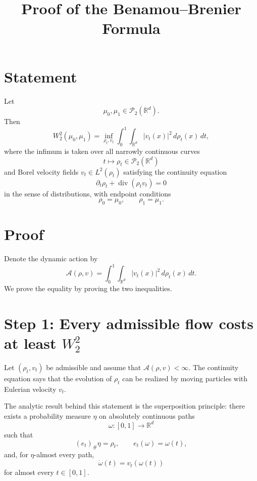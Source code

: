 \documentclass[11pt]{article}
\title{Proof of the Benamou--Brenier Formula}
\author{}
\date{}
\begin{document}
\maketitle

\section*{Statement}

Let
\[
\mu_0,\mu_1\in \mathcal P_2(\mathbb R^d).
\]
Then
\[
W_2^2(\mu_0,\mu_1)
=
\inf_{\rho_t,v_t}
\int_0^1\int_{\mathbb R^d}|v_t(x)|^2\,d\rho_t(x)\,dt,
\]
where the infimum is taken over all narrowly continuous curves
\[
t\mapsto \rho_t\in \mathcal P_2(\mathbb R^d)
\]
and Borel velocity fields $v_t\in L^2(\rho_t)$ satisfying the continuity
equation
\[
\partial_t\rho_t+\operatorname{div}(\rho_t v_t)=0
\]
in the sense of distributions, with endpoint conditions
\[
\rho_0=\mu_0,
\qquad
\rho_1=\mu_1.
\]

\section*{Proof}

Denote the dynamic action by
\[
\mathcal A(\rho,v)
=
\int_0^1\int_{\mathbb R^d}|v_t(x)|^2\,d\rho_t(x)\,dt.
\]
We prove the equality by proving the two inequalities.

\section*{Step 1: Every admissible flow costs at least $W_2^2$}

Let $(\rho_t,v_t)$ be admissible and assume that $\mathcal A(\rho,v)<\infty$.
The continuity equation says that the evolution of $\rho_t$ can be realized by
moving particles with Eulerian velocity $v_t$.

The analytic result behind this statement is the superposition principle: there
exists a probability measure $\eta$ on absolutely continuous paths
\[
\omega:[0,1]\to\mathbb R^d
\]
such that
\[
(e_t)_\#\eta=\rho_t,
\qquad
e_t(\omega)=\omega(t),
\]
and, for $\eta$-almost every path,
\[
\dot\omega(t)=v_t(\omega(t))
\]
for almost every $t\in[0,1]$.
\end{document}
